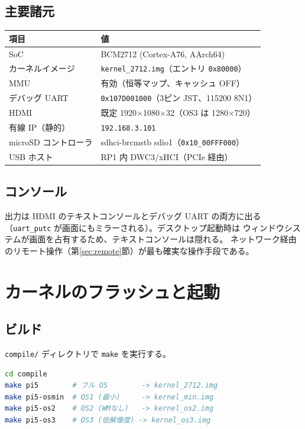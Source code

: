 \documentclass[a4paper,11pt]{ltjsarticle}
\begin{document}
\subsection{主要諸元}
\begin{longtable}{ll}
\hline
項目 & 値 \\
\hline
SoC & BCM2712 (Cortex-A76, AArch64) \\
カーネルイメージ & \texttt{kernel\_2712.img}（エントリ \texttt{0x80000}）\\
MMU & 有効（恒等マップ、キャッシュ OFF）\\
デバッグ UART & \texttt{0x107D001000}（3ピン JST、115200 8N1）\\
HDMI & 既定 1920$\times$1080$\times$32（OS3 は 1280$\times$720）\\
有線 IP（静的） & \texttt{192.168.3.101} \\
microSD コントローラ & sdhci-brcmstb sdio1（\texttt{0x10\_00FFF000}）\\
USB ホスト & RP1 内 DWC3/xHCI（PCIe 経由）\\
\hline
\end{longtable}

\subsection{コンソール}
出力は HDMI のテキストコンソールとデバッグ UART の両方に出る
（\texttt{uart\_putc} が画面にもミラーされる）。デスクトップ起動時は
ウィンドウシステムが画面を占有するため、テキストコンソールは隠れる。
ネットワーク経由のリモート操作（第\ref{sec:remote}節）が最も確実な操作手段である。

\section{カーネルのフラッシュと起動}

\subsection{ビルド}
\texttt{compile/} ディレクトリで \texttt{make} を実行する。

\begin{lstlisting}[language=bash]
cd compile
make pi5        # フル OS        -> kernel_2712.img
make pi5-osmin  # OS1 (最小)     -> kernel_min.img
make pi5-os2    # OS2 (WMなし)   -> kernel_os2.img
make pi5-os3    # OS3 (低解像度) -> kernel_os3.img
\end{lstlisting}
\end{document}
